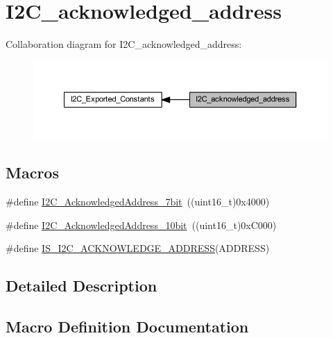 \hypertarget{group___i2_c__acknowledged__address}{}\section{I2\+C\+\_\+acknowledged\+\_\+address}
\label{group___i2_c__acknowledged__address}
Collaboration diagram for I2\+C\+\_\+acknowledged\+\_\+address\+:
\nopagebreak
\begin{figure}[H]
\begin{center}
\leavevmode
\includegraphics[width=350pt]{group___i2_c__acknowledged__address}
\end{center}
\end{figure}
\subsection*{Macros}
\begin{DoxyCompactItemize}
\item 
\#define \hyperlink{group___i2_c__acknowledged__address_ga5e5ad2148f9da14457c7b59357acee97}{I2\+C\+\_\+\+Acknowledged\+Address\+\_\+7bit}~((uint16\+\_\+t)0x4000)
\item 
\#define \hyperlink{group___i2_c__acknowledged__address_gaf0bb8f71795f046ad9f6c1fc7fe0fc53}{I2\+C\+\_\+\+Acknowledged\+Address\+\_\+10bit}~((uint16\+\_\+t)0x\+C000)
\item 
\#define \hyperlink{group___i2_c__acknowledged__address_ga26a3af0a468f7226ed72fde27528c0ba}{I\+S\+\_\+\+I2\+C\+\_\+\+A\+C\+K\+N\+O\+W\+L\+E\+D\+G\+E\+\_\+\+A\+D\+D\+R\+E\+SS}(A\+D\+D\+R\+E\+SS)
\end{DoxyCompactItemize}


\subsection{Detailed Description}


\subsection{Macro Definition Documentation}
\mbox{\label{group___i2_c__acknowledged__address_gaf0bb8f71795f046ad9f6c1fc7fe0fc53}} 
